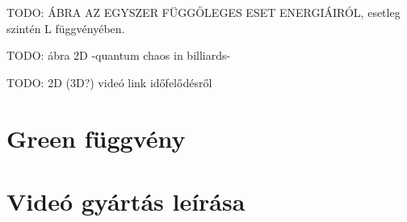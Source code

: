 \documentclass[a4paper,titlepage]{article}
\begin{document}
    TODO: ÁBRA AZ EGYSZER FÜGGŐLEGES ESET ENERGIÁIRÓL, esetleg szintén L függvényében.
    
    TODO: ábra 2D -quantum chaos in billiards-
    
    TODO: 2D (3D?) videó link időfelődésről
    
\section{Green függvény}
    
\section{Videó gyártás leírása}
    
    
    
\end{document}

